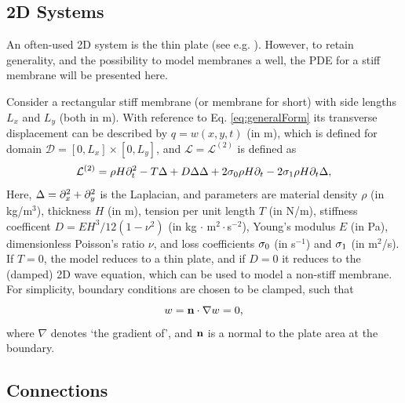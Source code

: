 \documentclass{article}
\begin{document}
\subsection{2D Systems}
An often-used 2D system is the thin plate (see e.g. \cite{Webb2015, Willemsen2020}). However, to retain generality, and the possibility to model membranes a well, the PDE for a stiff membrane will be presented here.

Consider a rectangular stiff membrane (or membrane for short) with side lengths $L_x$ and $L_y$ (both in m). With reference to Eq. \eqref{eq:generalForm} its transverse displacement can be described by $q = w(x, y, t)$ (in m), which is defined for domain
$\mathcal{D} = [0, L_x] \times [0, L_y]$, and $\mathcal{L}=\mathcal{L}^{(2)}$ is defined as \cite{Fletcher1998}
\begin{equation}\label{eq:stiffMembrane}
        \mathcal{L}^{(2)} = \rho H\partial_t^2 - T \Delta + D \Delta\Delta+ 2\sigma_{0}\rho H\partial_t - 2 \sigma_{1}\rho H\partial_t\Delta,
\end{equation}
Here, $\Delta = \partial_x^2 + \partial_y^2$ is the Laplacian, and parameters are material density $\rho$ (in kg/m$^3$), thickness $H$ (in m), tension per unit length $T$ (in N/m), stiffness coefficent $D = E H^3 / 12 (1-\nu^2)$ (in kg $\cdot$ m$^2\cdot$s$^{-2}$), Young's modulus $E$ (in Pa), dimensionless Poisson's ratio $\nu$, and loss coefficients $\sigma_{0}$ (in s$^{-1}$) and $\sigma_{1}$ (in m$^2$/s).
If $T = 0$, the model reduces to a thin plate, and if $D=0$ it reduces to the (damped) 2D wave equation, which can be used to model a non-stiff membrane.
%
For simplicity, boundary conditions are chosen to be clamped, such that
\begin{equation}
        w = {\bf n} \cdot \nabla w = 0,
\end{equation}
where $\nabla$ denotes `the gradient of', and ${\bf n}$ is a normal to the plate area at the boundary.

\subsection{Connections}\label{sec:contConnections}
\end{document}
